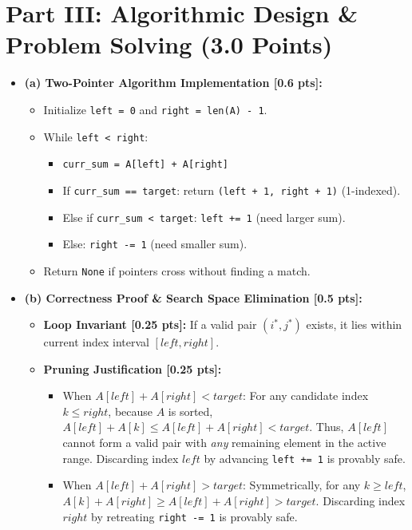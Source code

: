 \documentclass[11pt,a4paper]{article}
\begin{document}
\newpage

\section*{Part III: Algorithmic Design \& Problem Solving (3.0 Points)}

\begin{solutionbox}
\begin{itemize}
    \item \textbf{(a) Two-Pointer Algorithm Implementation [0.6 pts]:}
    \begin{itemize}
        \item Initialize \texttt{left = 0} and \texttt{right = len(A) - 1}.
        \item While \texttt{left < right}:
        \begin{itemize}
            \item \texttt{curr\_sum = A[left] + A[right]}
            \item If \texttt{curr\_sum == target}: return \texttt{(left + 1, right + 1)} (1-indexed).
            \item Else if \texttt{curr\_sum < target}: \texttt{left += 1} (need larger sum).
            \item Else: \texttt{right -= 1} (need smaller sum).
        \end{itemize}
        \item Return \texttt{None} if pointers cross without finding a match.
    \end{itemize}
    \item \textbf{(b) Correctness Proof \& Search Space Elimination [0.5 pts]:}
    \begin{itemize}
        \item \textbf{Loop Invariant [0.25 pts]:} If a valid pair $(i^*, j^*)$ exists, it lies within current index interval $[left, right]$.
        \item \textbf{Pruning Justification [0.25 pts]:}
        \begin{itemize}
            \item When $A[left] + A[right] < target$: For any candidate index $k \le right$, because $A$ is sorted, $A[left] + A[k] \le A[left] + A[right] < target$. Thus, $A[left]$ cannot form a valid pair with \textit{any} remaining element in the active range. Discarding index $left$ by advancing \texttt{left += 1} is provably safe.
            \item When $A[left] + A[right] > target$: Symmetrically, for any $k \ge left$, $A[k] + A[right] \ge A[left] + A[right] > target$. Discarding index $right$ by retreating \texttt{right -= 1} is provably safe.

\end{itemize}
\end{itemize}
\end{itemize}
\end{solutionbox}
\end{document}
